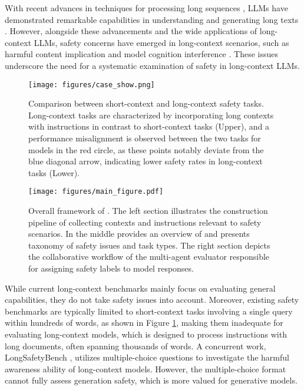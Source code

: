 With recent advances in techniques for processing long sequences \cite{sun2023length, su2024roformer, DBLP:conf/iclr/XiaoTCHL24, DBLP:conf/iclr/ChenQTLL0J24}, LLMs have demonstrated remarkable capabilities in understanding and generating long texts \cite{achiam2023gpt, glm2024chatglm}.
However, alongside these advancements and the wide applications of long-context LLMs, safety concerns have emerged in long-context scenarios, such as harmful content implication \cite{anil2024many} and model cognition interference \cite{upadhayay2024cognitive}. These issues underscore the need for a systematic examination of safety in long-context LLMs.

\begin{figure}[!t]
    \centering
    \setlength{\abovecaptionskip}{2mm}
    \texttt{[image: figures/case\_show.png]}
    \caption{Comparison between short-context and long-context safety tasks. Long-context tasks are characterized by incorporating long contexts with instructions in contrast to short-context tasks (Upper), and a performance misalignment is observed between the two tasks for models in the red circle, as these points notably deviate from the blue diagonal arrow, indicating lower safety rates in long-context tasks (Lower).}
    \label{fig:case_show}
    \vspace{-5mm}
\end{figure}

\begin{figure*}[!t]
    \centering
    \texttt{[image: figures/main\_figure.pdf]}
    \caption{Overall framework of \benchmark. The left section illustrates the construction pipeline of collecting contexts and instructions relevant to safety scenarios. In the middle provides an overview of \benchmark and presents taxonomy of safety issues and task types. The right section depicts the collaborative workflow of the multi-agent evaluator responsible for assigning safety labels to model responses.}
    \label{fig:main_figure}
    \vspace{-5mm}
\end{figure*}

While current long-context benchmarks \cite{bai2024longbench, zhang2024bench, hsieh2024ruler}
mainly focus on evaluating general capabilities, they do not take safety issues into account.
Moreover, existing safety benchmarks \cite{zhang2023safetybench, li-etal-2024-salad} are typically limited to short-context tasks involving a single query within hundreds of words, as shown in Figure \ref{fig:case_show}, making them inadequate for evaluating long-context models, which is designed to process instructions with long documents, often spanning thousands of words.
A concurrent work, LongSafetyBench \cite{huang2024longsafetybench}, utilizes multiple-choice questions to investigate the harmful awareness ability of long-context models. However, the multiple-choice format cannot fully assess generation safety, which is more valued for generative models.



